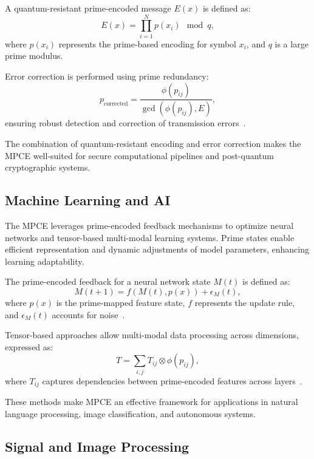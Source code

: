 \documentclass{article}
\theoremstyle{plain}
\begin{document}
A quantum-resistant prime-encoded message \( E(x) \) is defined as:
\begin{equation}
    E(x) = \prod_{i=1}^N p(x_i) \mod q,
\end{equation}
where \( p(x_i) \) represents the prime-based encoding for symbol \( x_i \), and \( q \) is a large prime modulus.

Error correction is performed using prime redundancy:
\begin{equation}
    p_{\text{corrected}} = \frac{\phi(p_{ij})}{\gcd(\phi(p_{ij}), E)},
\end{equation}
ensuring robust detection and correction of transmission errors~\cite{haroche2013nobel, shor1994algorithms}.

The combination of quantum-resistant encoding and error correction makes the MPCE well-suited for secure computational pipelines and post-quantum cryptographic systems.

\subsection{Machine Learning and AI}

The MPCE leverages prime-encoded feedback mechanisms to optimize neural networks and tensor-based multi-modal learning systems. Prime states enable efficient representation and dynamic adjustments of model parameters, enhancing learning adaptability.

The prime-encoded feedback for a neural network state \( M(t) \) is defined as:
\begin{equation}
    M(t+1) = f(M(t), p(x)) + \epsilon_M(t),
\end{equation}
where \( p(x) \) is the prime-mapped feature state, \( f \) represents the update rule, and \( \epsilon_M(t) \) accounts for noise~\cite{grover1996fast, wang2021quantum}.

Tensor-based approaches allow multi-modal data processing across dimensions, expressed as:
\begin{equation}
    T = \sum_{i,j} T_{ij} \otimes \phi(p_{ij}),
\end{equation}
where \( T_{ij} \) captures dependencies between prime-encoded features across layers~\cite{vidal2003efficient}.

These methods make MPCE an effective framework for applications in natural language processing, image classification, and autonomous systems.

\subsection{Signal and Image Processing}
\end{document}
